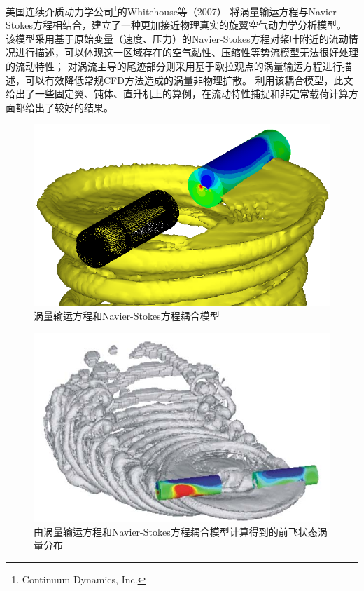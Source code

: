 \documentclass[doctor,openright,twoside,color]{buaathesis}
\begin{document}
美国连续介质动力学公司\footnote{Continuum Dynamics, Inc.}的Whitehouse等（2007）
将涡量输运方程与Navier-Stokes方程相结合，建立了一种更加接近物理真实的旋翼空气动力学分析模型。
该模型采用基于原始变量（速度、压力）的Navier-Stokes方程对桨叶附近的流动情况进行描述，可以体现这一区域存在的空气黏性、压缩性等势流模型无法很好处理的流动特性；
对涡流主导的尾迹部分则采用基于欧拉观点的涡量输运方程进行描述，可以有效降低常规CFD方法造成的涡量非物理扩散。
利用该耦合模型，此文给出了一些固定翼、钝体、直升机上的算例，在流动特性捕捉和非定常载荷计算方面都给出了较好的结果。
\begin{figure}[t!]
    \centering
    \includegraphics[height=0.25\textheight]{figures/whitehouse.png}
    \caption{涡量输运方程和Navier-Stokes方程耦合模型}
\end{figure}
\begin{figure}[t!]
    \centering
    \includegraphics[height=0.25\textheight]{figures/whitehouse1.png}
    \caption{由涡量输运方程和Navier-Stokes方程耦合模型计算得到的前飞状态涡量分布}
\end{figure}
\end{document}
